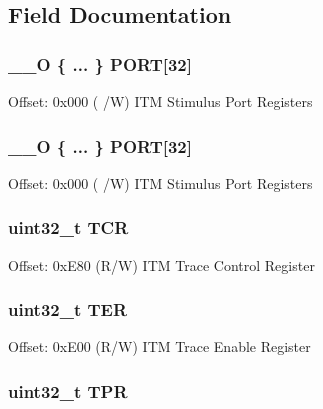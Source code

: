 \subsection{Field Documentation}
\hypertarget{struct_i_t_m___type_a4dd73c3e23203dc5c6c278c706cb8d8f}{
\subsubsection[{P\-O\-R\-T}]{\setlength{\rightskip}{0pt plus 5cm}\-\_\-\-\_\-\-O \{ ... \}    P\-O\-R\-T\mbox{[}32\mbox{]}}}\label{struct_i_t_m___type_a4dd73c3e23203dc5c6c278c706cb8d8f}
Offset\-: 0x000 ( /\-W) I\-T\-M Stimulus Port Registers \hypertarget{struct_i_t_m___type_a335fd4d241941d31cd284e0db37c381a}{
\subsubsection[{P\-O\-R\-T}]{\setlength{\rightskip}{0pt plus 5cm}\-\_\-\-\_\-\-O \{ ... \}    P\-O\-R\-T\mbox{[}32\mbox{]}}}\label{struct_i_t_m___type_a335fd4d241941d31cd284e0db37c381a}
Offset\-: 0x000 ( /\-W) I\-T\-M Stimulus Port Registers \hypertarget{struct_i_t_m___type_ae9dd9282fab299d0cd6e119564688e53}{
\subsubsection[{T\-C\-R}]{ uint32\-\_\-t T\-C\-R}}\label{struct_i_t_m___type_ae9dd9282fab299d0cd6e119564688e53}
Offset\-: 0x\-E80 (R/\-W) I\-T\-M Trace Control Register \hypertarget{struct_i_t_m___type_a8ffb3c6b706b03334f6fe37ef5d8b165}{
\subsubsection[{T\-E\-R}]{ uint32\-\_\-t T\-E\-R}}\label{struct_i_t_m___type_a8ffb3c6b706b03334f6fe37ef5d8b165}
Offset\-: 0x\-E00 (R/\-W) I\-T\-M Trace Enable Register \hypertarget{struct_i_t_m___type_a72bb9b7d61fe3262cd2a6070a7bd5b69}{
\subsubsection[{T\-P\-R}]{ uint32\-\_\-t T\-P\-R}}\label{struct_i_t_m___type_a72bb9b7d61fe3262cd2a6070a7bd5b69}
